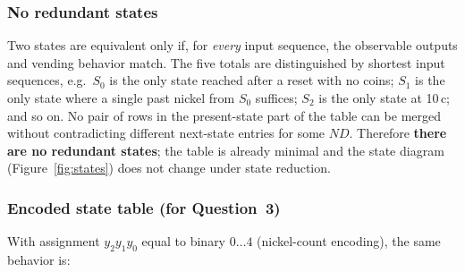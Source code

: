 \documentclass[12pt, letterpaper]{article}
\begin{document}
\subsubsection*{No redundant states}

Two states are equivalent only if, for \emph{every} input sequence, the observable outputs and
vending behavior match.  The five totals are distinguished by shortest input sequences, e.g.\
$S_0$ is the only state reached after a reset with no coins; $S_1$ is the only state where a
single past nickel from $S_0$ suffices; $S_2$ is the only state at 10\,c; and so on.  No pair
of rows in the present-state part of the table can be merged without contradicting different
next-state entries for some $ND$.  Therefore \textbf{there are no redundant states}; the table
is already minimal and the state diagram (Figure~\ref{fig:states}) does not change under state reduction.

\subsubsection*{Encoded state table (for Question~3)}

With assignment $y_2y_1y_0$ equal to binary $0\ldots 4$ (nickel-count encoding), the same
behavior is:
\end{document}
